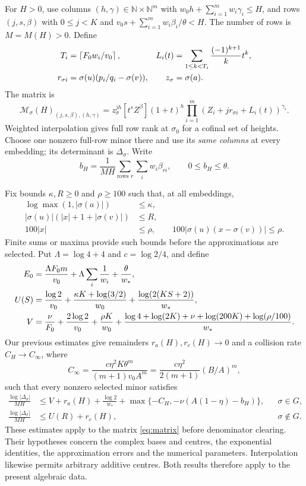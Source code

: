 \documentclass[11pt]{article}
\newcommand{\N}{\mathbb N}
\newcommand{\wt}[1]{\sum_{i=1}^m w_i #1_i}
\theoremstyle{remark}
\begin{document}
For $H>0$, use columns $(h,\gamma)\in\N\times\N^m$ with
$w_0h+\wt\gamma\le H$, and rows $(j,s,\beta)$ with
$0\le j<K$ and $v_0s+\wt\beta/\theta<H$. The number of rows is $M=M(H)>0$.
Define
\begin{align}
 T_i&=\left\lceil F_0w_i/v_0\right\rceil,&
 L_i(t)&=\sum_{1\le k<T_i}\frac{(-1)^{k+1}}k t^k,\label{eq:truncation}\\
 r_{\sigma i}&=\sigma(u)(p_i/q_i-\sigma(v)),&
 z_\sigma&=\sigma(a).\notag
\end{align}
The matrix is
\begin{equation}\label{eq:matrix}
\mathcal M_\sigma(H)_{(j,s,\beta),(h,\gamma)}
=z_\sigma^{jh}[t^sZ^\beta](1+t)^h
  \prod_{i=1}^m(Z_i+jr_{\sigma i}+L_i(t))^{\gamma_i}.
\end{equation}
Weighted interpolation gives full row rank at $\sigma_0$ for a cofinal
set of heights. Choose one nonzero full-row minor there and use its
\emph{same columns} at every embedding; its determinant is $\Delta_\sigma$.
Write
\[
b_H=\frac1{MH}\sum_{\text{rows }r}\sum_iw_i\beta_{ri},
\qquad 0\le b_H\le\theta.
\]

Fix bounds $\kappa,R\ge0$ and $\rho\ge100$ such that, at all embeddings,
\begin{align*}
\log\max(1,|\sigma(a)|)&\le\kappa,\\
|\sigma(u)|(|x|+1+|\sigma(v)|)&\le R,\\
100|x|&\le\rho,\qquad
100|\sigma(u)(x-\sigma(v))|\le\rho.
\end{align*}
Finite sums or maxima provide such bounds before the approximations
are selected. Put $\Lambda=\log4+4$ and $c=\log2/4$, and define
\begin{align}
 E_0&=\frac{\Lambda F_0m}{v_0}+\Lambda\sum_i\frac1{w_i}
                 +\frac\theta{w_*},\label{eq:costs}\\
 U(S)&=\frac{\log2}{v_0}+\frac{\kappa K+\log(3/2)}{w_0}
             +\frac{\log(2(KS+2))}{w_*},\notag\\
 V&=\frac\nu{F_0}+\frac{2\log2}{v_0}+\frac{\rho K}{w_0}
 +\frac{\log4+\log(2K)+\nu+\log(200K)+\log(\rho/100)}{w_*}.\notag
\end{align}
Our previous estimates \cite[Sections 7--8]{affine} give
remainders $r_a(H),r_c(H)\to0$ and a collision rate
$C_H\to C_\infty$, where
\begin{equation}\label{eq:collision}
C_\infty=\frac{c\eta^2K\theta^m}{(m+1)v_0A^m}
        =\frac{c\eta^2}{2(m+1)}(B/A)^m,
\end{equation}
such that every nonzero selected minor satisfies
\begin{align}
\frac{\log|\Delta_\sigma|}{MH}
&\le V+r_a(H)+\frac{\log2}{w_*}
 +\max\{-C_H,-\nu(A(1-\eta)-b_H)\},&&\sigma\in G,\label{eq:good}\\
\frac{\log|\Delta_\sigma|}{MH}
&\le U(R)+r_c(H),&&\sigma\notin G.\label{eq:coarse}
\end{align}
These estimates apply to the matrix \eqref{eq:matrix} before denominator
clearing. Their hypotheses concern the complex bases and centres, the
exponential identities, the approximation errors and the numerical
parameters. Interpolation likewise permits arbitrary additive centres.
Both results therefore apply to the present algebraic data.
\end{document}
